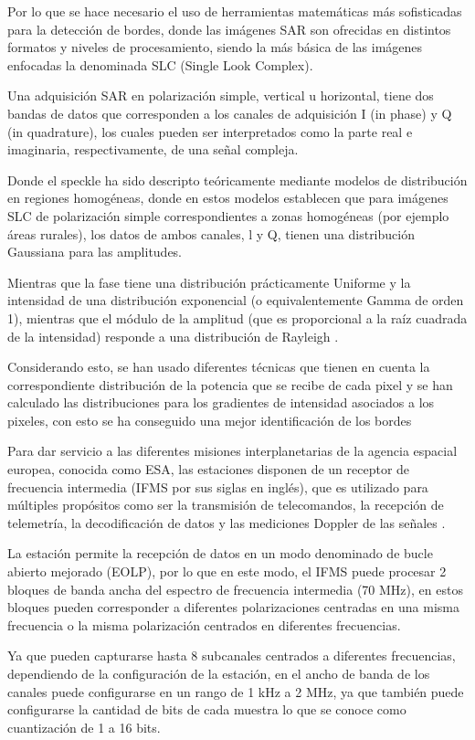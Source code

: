 Por lo que se hace necesario el uso de herramientas matemáticas más sofisticadas para la detección de bordes, donde las imágenes SAR son ofrecidas en distintos formatos y niveles de procesamiento, siendo la más básica de las imágenes enfocadas la denominada SLC (Single Look Complex). 

Una adquisición SAR en polarización simple, vertical u horizontal, tiene dos bandas de datos que corresponden a los canales de adquisición I (in phase) y Q (in quadrature), los cuales pueden ser interpretados como la parte real e imaginaria, respectivamente, de una señal compleja.

Donde el speckle ha sido descripto teóricamente mediante modelos de distribución en regiones homogéneas, donde en estos modelos establecen que para imágenes SLC de polarización simple correspondientes a zonas homogéneas (por ejemplo áreas rurales), los datos de ambos canales, l y Q, tienen una distribución Gaussiana para las amplitudes. 

Mientras que la fase tiene una distribución prácticamente Uniforme y la intensidad de una distribución exponencial (o equivalentemente Gamma de orden 1), mientras que el módulo de la amplitud (que es proporcional a la raíz cuadrada de la intensidad) responde a una distribución de Rayleigh . 

Considerando esto, se han usado diferentes técnicas que tienen en cuenta la correspondiente distribución de la potencia que se recibe de cada pixel y se han calculado las distribuciones para los gradientes de intensidad asociados a los pixeles, con esto se ha conseguido una mejor identificación de los bordes

Para dar servicio a las diferentes misiones interplanetarias de la agencia espacial europea, conocida como ESA, las estaciones disponen de un receptor de frecuencia intermedia (IFMS por sus siglas en inglés), que es utilizado para múltiples propósitos como ser la transmisión de telecomandos, la recepción de telemetría, la decodificación de datos y las mediciones Doppler de las señales \cite{Cancio2017}.

La estación permite la recepción de datos en un modo denominado de bucle abierto mejorado (EOLP), por lo que en este modo, el IFMS puede procesar 2 bloques de banda ancha del espectro de frecuencia intermedia (70 MHz), en estos bloques pueden corresponder a diferentes polarizaciones centradas en una misma frecuencia o la misma polarización centrados en diferentes frecuencias. 

Ya que pueden capturarse hasta 8 subcanales centrados a diferentes frecuencias, dependiendo de la configuración de la estación, en el ancho de banda de los canales puede configurarse en un rango de 1 kHz a 2 MHz, ya que también puede configurarse la cantidad de bits de cada muestra lo que se conoce como cuantización de 1 a 16 bits. 

